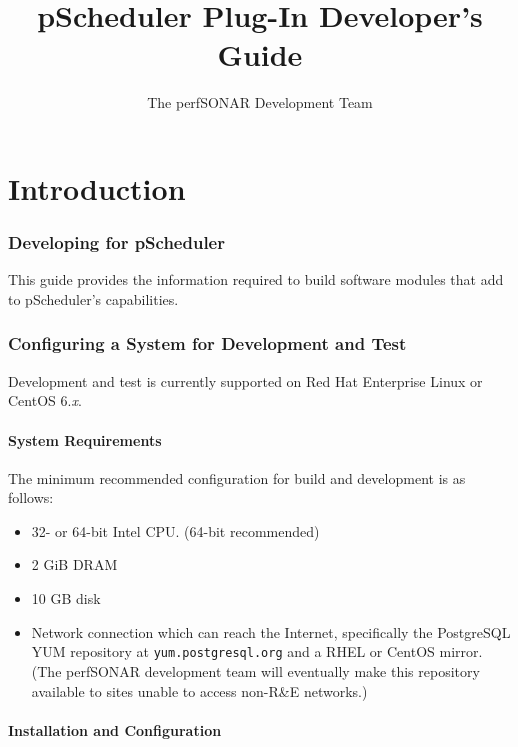 \documentclass[10pt,titlepage]{article}
\title{pScheduler Plug-In Developer's Guide}
\author{The perfSONAR Development Team}
\begin{document}
\maketitle
\tableofcontents


\part{Introduction}

\section{Developing for pScheduler}

This guide provides the information required to build software modules
that add to pScheduler's capabilities.



\section{Configuring a System for Development and Test}

Development and test is currently supported on Red Hat Enterprise
Linux or CentOS 6.{\it x}.



\subsection{System Requirements}

The minimum recommended configuration for build and development is as
follows:

\begin{itemize}
\item 32- or 64-bit Intel CPU.  (64-bit recommended)
\item 2 GiB DRAM
\item 10 GB disk
\item Network connection which can reach the Internet, specifically
  the PostgreSQL YUM repository at {\tt yum.postgresql.org} and a RHEL
  or CentOS mirror.  (The perfSONAR development team will eventually
  make this repository available to sites unable to access non-R\&E
  networks.)
\end{itemize}


\subsection{Installation and Configuration}
\end{document}
